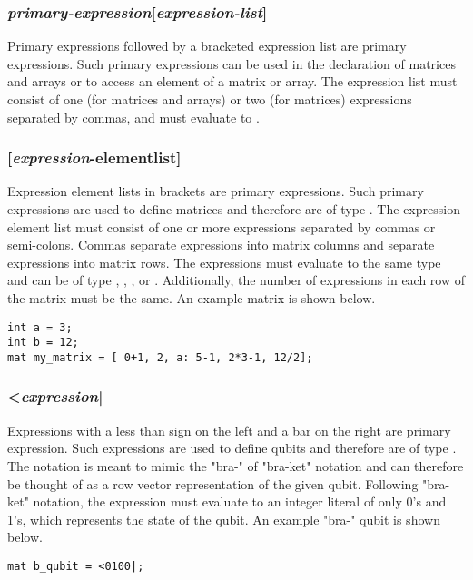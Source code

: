 \subsubsection{\textit{primary-expression}[\textit{expression-list}]}
Primary expressions followed by a bracketed expression list are primary expressions. Such primary expressions can be used in the declaration of matrices and arrays or to access an element of a matrix or array. The expression list must consist of one (for matrices and arrays) or two (for matrices) expressions separated by commas, and must evaluate to \integ.

\subsubsection{[\textit{expression}-elementlist]}
Expression element lists in brackets are primary expressions. Such primary expressions are used to define matrices and therefore are of type \mat. The expression element list must consist of one or more expressions separated by commas or semi-colons. Commas separate expressions into matrix columns and  separate expressions into matrix rows. The expressions must evaluate to the same type and can be of type \integ, \float, \complex, or \mat. Additionally, the number of expressions in each row of the matrix must be the same. An example matrix is shown below.

\begin{lstlisting}
int a = 3;
int b = 12;
mat my_matrix = [ 0+1, 2, a: 5-1, 2*3-1, 12/2];
\end{lstlisting}

\subsubsection{<\textit{expression}|}
Expressions with a less than sign on the left and a bar on the right are primary expression. Such expressions are used to define qubits and therefore are of type \mat. The notation is meant to mimic the "bra-" of "bra-ket" notation and can therefore be thought of as a row vector representation of the given qubit. Following "bra-ket" notation, the expression must evaluate  to an integer literal of only 0's and 1's, which represents the state of the qubit. An example "bra-" qubit is shown below.

\begin{lstlisting}
mat b_qubit = <0100|;
\end{lstlisting}


